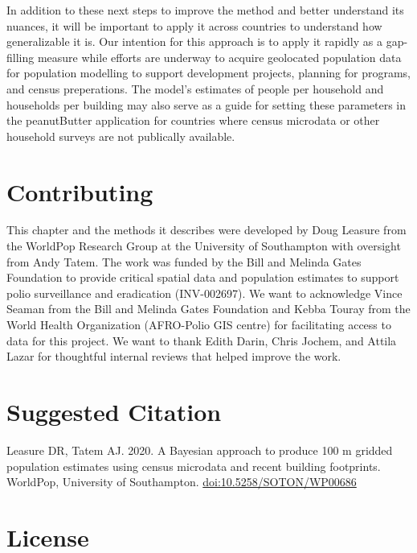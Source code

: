 \documentclass[]{book}
\begin{document}
In addition to these next steps to improve the method and better
understand its nuances, it will be important to apply it across
countries to understand how generalizable it is. Our intention for this
approach is to apply it rapidly as a gap-filling measure while efforts
are underway to acquire geolocated population data for population
modelling to support development projects, planning for programs, and
census preperations. The model's estimates of people per household and
households per building may also serve as a guide for setting these
parameters in the peanutButter application
\citep{leasure2020peanutbutter} for countries where census microdata or
other household surveys are not publically available.

\section*{Contributing}\label{contributing-6}

This chapter and the methods it describes were developed by Doug Leasure
from the WorldPop Research Group at the University of Southampton with
oversight from Andy Tatem. The work was funded by the Bill and Melinda
Gates Foundation to provide critical spatial data and population
estimates to support polio surveillance and eradication (INV-002697). We
want to acknowledge Vince Seaman from the Bill and Melinda Gates
Foundation and Kebba Touray from the World Health Organization
(AFRO-Polio GIS centre) for facilitating access to data for this
project. We want to thank Edith Darin, Chris Jochem, and Attila Lazar
for thoughtful internal reviews that helped improve the work.

\section*{Suggested Citation}\label{suggested-citation-5}

Leasure DR, Tatem AJ. 2020. A Bayesian approach to produce 100 m gridded
population estimates using census microdata and recent building
footprints. WorldPop, University of Southampton.
{\url{doi:10.5258/SOTON/WP00686}}

\section*{License}\label{license-3}
\end{document}
